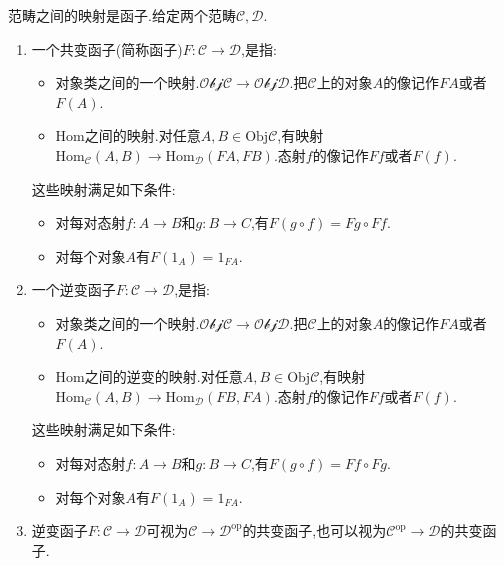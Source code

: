 范畴之间的映射是函子.给定两个范畴$\mathscr{C},\mathscr{D}$.
\begin{enumerate}
	\item 一个共变函子(简称函子)$F:\mathscr{C}\to\mathscr{D}$,是指:
	\begin{itemize}
		\item 对象类之间的一个映射.$\mathscr{Obj}\mathscr{C}\to\mathscr{Obj}\mathscr{D}$.把$\mathscr{C}$上的对象$A$的像记作$FA$或者$F(A)$.
		\item $\mathrm{Hom}$之间的映射.对任意$A,B\in\mathrm{Obj}\mathscr{C}$,有映射$\mathrm{Hom}_{\mathscr{C}}(A,B)\to\mathrm{Hom}_{\mathscr{D}}(FA,FB)$.态射$f$的像记作$Ff$或者$F(f)$.
	\end{itemize}

    这些映射满足如下条件:
    \begin{itemize}
    	\item 对每对态射$f:A\to B$和$g:B\to C$,有$F(g\circ f)=Fg\circ Ff$.
    	\item 对每个对象$A$有$F(1_A)=1_{FA}$.
    \end{itemize}
    \item 一个逆变函子$F:\mathscr{C}\to\mathscr{D}$,是指:
    \begin{itemize}
    	\item 对象类之间的一个映射.$\mathscr{Obj}\mathscr{C}\to\mathscr{Obj}\mathscr{D}$.把$\mathscr{C}$上的对象$A$的像记作$FA$或者$F(A)$.
    	\item $\mathrm{Hom}$之间的逆变的映射.对任意$A,B\in\mathrm{Obj}\mathscr{C}$,有映射$\mathrm{Hom}_{\mathscr{C}}(A,B)\to\mathrm{Hom}_{\mathscr{D}}(FB,FA)$.态射$f$的像记作$Ff$或者$F(f)$.
    \end{itemize}
    
    这些映射满足如下条件:
    \begin{itemize}
    	\item 对每对态射$f:A\to B$和$g:B\to C$,有$F(g\circ f)=Ff\circ Fg$.
    	\item 对每个对象$A$有$F(1_A)=1_{FA}$.
    \end{itemize}
    \item 逆变函子$F:\mathscr{C}\to\mathscr{D}$可视为$\mathscr{C}\to\mathscr{D}^{\mathrm{op}}$的共变函子,也可以视为$\mathscr{C}^{\mathrm{op}}\to\mathscr{D}$的共变函子.
\end{enumerate}

